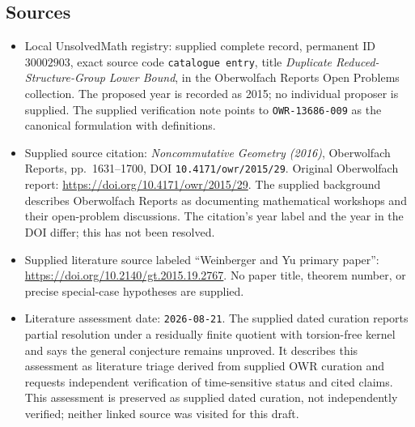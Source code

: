 \documentclass[11pt]{article}
\begin{document}
\subsection{Sources}
\begin{itemize}
\item Local UnsolvedMath registry: supplied complete record, permanent ID \(30002903\), exact source code \texttt{catalogue entry}, title \emph{Duplicate Reduced-Structure-Group Lower Bound}, in the Oberwolfach Reports Open Problems collection. The proposed year is recorded as 2015; no individual proposer is supplied. The supplied verification note points to \texttt{OWR-13686-009} as the canonical formulation with definitions.
\item Supplied source citation: \emph{Noncommutative Geometry (2016)}, Oberwolfach Reports, pp.\ 1631--1700, DOI \texttt{10.4171/owr/2015/29}. Original Oberwolfach report: \url{https://doi.org/10.4171/owr/2015/29}. The supplied background describes Oberwolfach Reports as documenting mathematical workshops and their open-problem discussions. The citation's year label and the year in the DOI differ; this has not been resolved.
\item Supplied literature source labeled ``Weinberger and Yu primary paper'': \url{https://doi.org/10.2140/gt.2015.19.2767}. No paper title, theorem number, or precise special-case hypotheses are supplied.
\item Literature assessment date: \texttt{2026-08-21}. The supplied dated curation reports partial resolution under a residually finite quotient with torsion-free kernel and says the general conjecture remains unproved. It describes this assessment as literature triage derived from supplied OWR curation and requests independent verification of time-sensitive status and cited claims. This assessment is preserved as supplied dated curation, not independently verified; neither linked source was visited for this draft.
\end{itemize}
\end{document}
